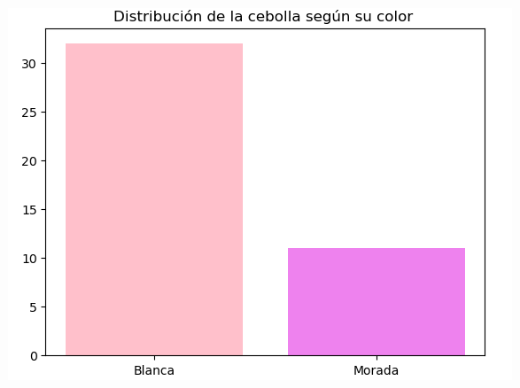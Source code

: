 \documentclass{beamer}
\begin{document}
\begin{frame}
    \includegraphics[scale=0.5]{color de la cebolla.png}
    \end{frame}
\end{document}
